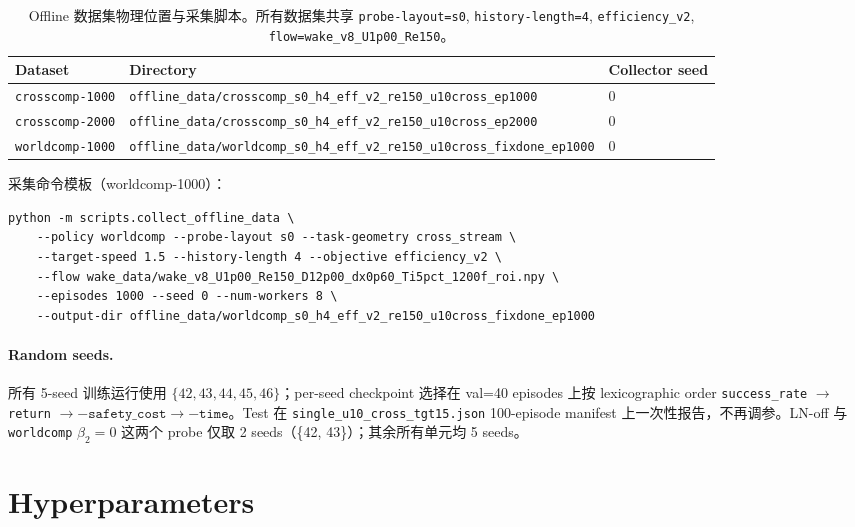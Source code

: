 \begin{table}[h]
\centering
\small
\caption{Offline 数据集物理位置与采集脚本。所有数据集共享 \texttt{probe-layout=s0}, \texttt{history-length=4}, \texttt{efficiency\_v2}, \texttt{flow=wake\_v8\_U1p00\_Re150}。}
\label{tab:repro_data}
\begin{tabular}{lll}
\toprule
\textbf{Dataset} & \textbf{Directory} & \textbf{Collector seed} \\
\midrule
\texttt{crosscomp-1000} & \texttt{offline\_data/crosscomp\_s0\_h4\_eff\_v2\_re150\_u10cross\_ep1000} & 0 \\
\texttt{crosscomp-2000} & \texttt{offline\_data/crosscomp\_s0\_h4\_eff\_v2\_re150\_u10cross\_ep2000} & 0 \\
\texttt{worldcomp-1000} & \texttt{offline\_data/worldcomp\_s0\_h4\_eff\_v2\_re150\_u10cross\_fixdone\_ep1000} & 0 \\
\bottomrule
\end{tabular}
\end{table}

采集命令模板（worldcomp-1000）：
\begin{verbatim}
python -m scripts.collect_offline_data \
    --policy worldcomp --probe-layout s0 --task-geometry cross_stream \
    --target-speed 1.5 --history-length 4 --objective efficiency_v2 \
    --flow wake_data/wake_v8_U1p00_Re150_D12p00_dx0p60_Ti5pct_1200f_roi.npy \
    --episodes 1000 --seed 0 --num-workers 8 \
    --output-dir offline_data/worldcomp_s0_h4_eff_v2_re150_u10cross_fixdone_ep1000
\end{verbatim}

\paragraph{Random seeds.}\quad
所有 5-seed 训练运行使用 $\{42, 43, 44, 45, 46\}$；per-seed checkpoint 选择在 val=40 episodes 上按 lexicographic order \texttt{success\_rate} $\to$ \texttt{return} $\to -\texttt{safety\_cost} \to -\texttt{time}$。Test 在 \texttt{single\_u10\_cross\_tgt15.json} 100-episode manifest 上一次性报告，不再调参。LN-off 与 \texttt{worldcomp} $\beta_2\!=\!0$ 这两个 probe 仅取 2 seeds（\{42, 43\}）；其余所有单元均 5 seeds。

\section{Hyperparameters}\label{app:hyperparams}

